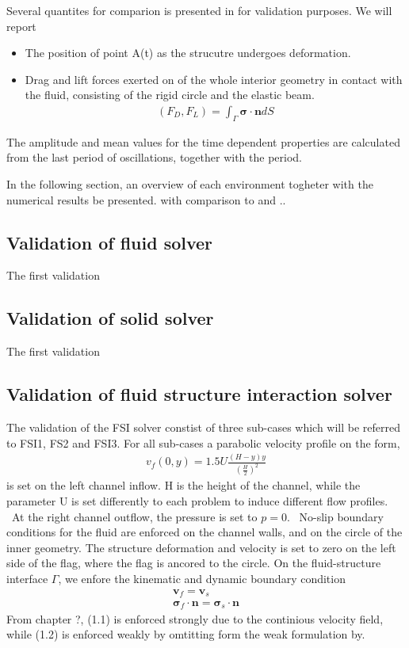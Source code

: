  Several quantites for comparion is presented in \cite{Hron2006} for validation purposes. We will report
\begin{itemize}
\item The position of point A(t) as the strucutre undergoes deformation.
\item Drag and lift forces exerted on of the whole interior geometry in contact with the fluid, consisting of the rigid circle and the elastic beam.
\begin{align*}
(F_D, F_L) = \int_{\Gamma} \mathbf{\sigma} \cdot \mathbf{n} dS
\end{align*}
\end{itemize}

The amplitude and mean values for the time dependent properties are calculated from the last period of oscillations, together with the period.

 In the following section, an overview of each environment togheter with  the numerical results be presented.  with comparison to \cite{Hron2006} and .. 
 
 
\subsection{Validation of fluid solver}
The first validation 

\subsection{Validation of solid solver}
The first validation 



\newpage
\subsection{Validation of fluid structure interaction solver}
The validation of the FSI solver constist of three sub-cases which will be referred to FSI1, FS2 and FSI3. For all sub-cases
a parabolic velocity profile on the form,
\begin{align*}
v_f(0, y) = 1.5 U\frac{(H -y)y}{(\frac{H}{2})^2}
\end{align*}
is set on the left channel inflow. H is the height of the channel, while the parameter U is set differently to each problem to induce different flow profiles. \
At the right channel outflow, the pressure is set to $p = 0$. \
No-slip boundary conditions for the fluid are enforced on the channel walls, and on the circle of the inner geometry. 
The structure deformation and velocity is set to zero on the left side of the flag, where the flag is ancored to the circle. On the fluid-structure interface $\Gamma$, we enfore the kinematic and dynamic boundary condition
\begin{align}
\mathbf{v}_f = \mathbf{v}_s \\
\mathbf{\sigma}_f \cdot \mathbf{n} = \mathbf{\sigma}_s \cdot \mathbf{n}
\end{align}
From chapter ?,  (1.1) is enforced strongly due to the continious velocity field, while (1.2) is enforced weakly by omtitting form the weak formulation by.


